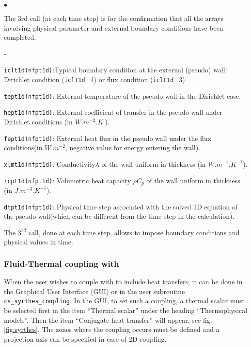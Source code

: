 {{{\begin{list}{$\bullet$}{}
\item The 3rd call (at each time step) is for the confirmation that all the arrays
 involving physical parameter and external boundary conditions have been completed.
\begin{list}{-}{}
\item \texttt{iclt1d(nfpt1d)}:Typical boundary condition at the external
 (pseudo) wall: Dirichlet condition (\texttt{iclt1d}=1) or flux condition (\texttt{iclt1d}=3)
\item \texttt{tept1d(nfpt1d)}: External temperature of the pseudo wall in the
 Dirichlet case.
\item \texttt{hept1d(nfpt1d)}: External coefficient of transfer in the pseudo
 wall under Dirichlet conditions (in $W.m^{-2}.K^.$).
\item \texttt{fept1d(nfpt1d)}: External heat flux in the pseudo wall under
 the flux conditions(in $W.m^{-2}$, negative value for energy entering the wall).
\item \texttt{xlmt1d(nfpt1d)}: Conductivity$\lambda$ of the wall uniform
in thickness (in $W.m^{-1}.K^{-1}$).
\item \texttt{rcpt1d(nfpt1d)}: Volumetric heat capacity $\rho C_p$ of the
wall uniform in thickness (in $J.m^{-3}.K^{-1}$).
\item \texttt{dtpt1d(nfpt1d)}: Physical time step ascociated with the solved
 1D equation of the pseudo wall(which can be different from the time step in the
 calculation).
\end{list}

\end{list}

The $3^{rd}$ call, done at each time step, allows to impose boundary conditions
 and physical values in time.

\subsubsection{Fluid-Thermal coupling with \syrthes}
When the user wishes to couple \CS with \syrthes to include heat transfers, it can be 
done in the Graphical User Interface (GUI) or in the user subroutine
\texttt{cs\_syrthes\_coupling}.
In the GUI, to set such a coupling, a thermal scalar must be 
selected first in the item ``Thermal scalar'' under the heading ``Thermophysical models''.
 Then the item ``Conjugate heat transfer'' will appear, see fig. \ref{fig:syrthes}.
 The zones where the coupling occurs must be defined and a projection axis can be 
specified in case of 2D coupling.

}}}
